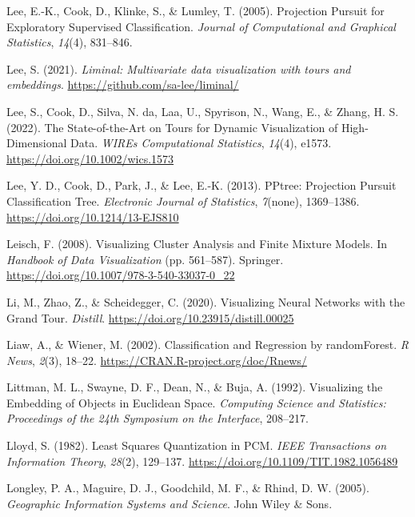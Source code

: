 \documentclass[
  letterpaper,
]{krantz}
\newcounter{none} %
\newlength{\cslhangindent}
\newenvironment{CSLReferences}[2] %
 {\begin{list}{}{%
  \setlength{\itemindent}{0pt}
  \setlength{\leftmargin}{0pt}
  \setlength{\parsep}{0pt}
  \ifodd #1
   \setlength{\leftmargin}{\cslhangindent}
   \setlength{\itemindent}{-1\cslhangindent}
  \fi
  \setlength{\itemsep}{#2\baselineskip}}}
 {\end{list}}
\begin{document}
\begin{CSLReferences}{1}{0}
Lee, E.-K., Cook, D., Klinke, S., \& Lumley, T. (2005). {P}rojection
{P}ursuit for {E}xploratory {S}upervised {C}lassification. \emph{Journal
of Computational and Graphical Statistics}, \emph{14}(4), 831--846.

Lee, S. (2021). \emph{Liminal: Multivariate data visualization with
tours and embeddings}. \url{https://github.com/sa-lee/liminal/}

Lee, S., Cook, D., Silva, N. da, Laa, U., Spyrison, N., Wang, E., \&
Zhang, H. S. (2022). The {S}tate-of-the-{A}rt on {T}ours for {D}ynamic
{V}isualization of {H}igh-{D}imensional {D}ata. \emph{WIREs
Computational Statistics}, \emph{14}(4), e1573.
\url{https://doi.org/10.1002/wics.1573}

Lee, Y. D., Cook, D., Park, J., \& Lee, E.-K. (2013). {PPtree:
{P}rojection {P}ursuit {C}lassification {T}ree}. \emph{Electronic
Journal of Statistics}, \emph{7}(none), 1369--1386.
\url{https://doi.org/10.1214/13-EJS810}

Leisch, F. (2008). Visualizing {C}luster {A}nalysis and {F}inite
{M}ixture {M}odels. In \emph{Handbook of {D}ata {V}isualization} (pp.
561--587). Springer. \url{https://doi.org/10.1007/978-3-540-33037-0_22}

Li, M., Zhao, Z., \& Scheidegger, C. (2020). Visualizing {N}eural
{N}etworks with the {G}rand {T}our. \emph{Distill}.
\url{https://doi.org/10.23915/distill.00025}

Liaw, A., \& Wiener, M. (2002). Classification and {R}egression by
{randomForest}. \emph{R News}, \emph{2}(3), 18--22.
\url{https://CRAN.R-project.org/doc/Rnews/}

Littman, M. L., Swayne, D. F., Dean, N., \& Buja, A. (1992). Visualizing
the {E}mbedding of {O}bjects in {E}uclidean {S}pace. \emph{Computing
Science and Statistics: Proceedings of the 24th Symposium on the
Interface}, 208--217.

Lloyd, S. (1982). Least {S}quares {Q}uantization in PCM. \emph{IEEE
Transactions on Information Theory}, \emph{28}(2), 129--137.
\url{https://doi.org/10.1109/TIT.1982.1056489}

Longley, P. A., Maguire, D. J., Goodchild, M. F., \& Rhind, D. W.
(2005). \emph{Geographic {I}nformation {S}ystems and {S}cience}. John
Wiley \& Sons.


\end{CSLReferences}
\end{document}
